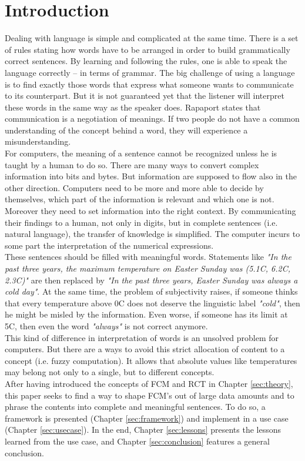 \documentclass[conference]{IEEEtran}
\begin{document}
\section{Introduction}
Dealing with language is simple and complicated at the same time. There is a set of rules stating how words have to be arranged in order to build grammatically correct sentences. By learning and following the rules, one is able to speak the language correctly -- in terms of grammar. The big challenge of using a language is to find exactly those words that express what someone wants to communicate to its counterpart. But it is not guaranteed yet that the listener will interpret these words in the same way as the speaker does. Rapaport \cite{Rapaport2003} states that communication is a negotiation of meanings. If two people do not have a common understanding of the concept behind a word, they will experience a misunderstanding.\\
For computers, the meaning of a sentence cannot be recognized unless he is taught by a human to do so. There are many ways to convert complex information into bits and bytes. But information are supposed to flow also in the other direction. Computers need to be more and more able to decide by themselves, which part of the information is relevant and which one is not. Moreover they need to set information into the right context. By communicating their findings to a human, not only in digits, but in complete sentences (i.e. natural language), the transfer of knowledge is simplified. The computer incurs to some part the interpretation of the numerical expressions.\\
These sentences should be filled with meaningful words. Statements like \emph{"In the past three years, the maximum temperature on Easter Sunday was (5.1\degree C, 6.2\degree C, 2.3\degree C)"} are then replaced by \emph{"In the past three years, Easter Sunday was always a cold day"}. At the same time, the problem of subjectivity raises, if someone thinks that every temperature above 0\degree C does not deserve the linguistic label \emph{"cold"}, then he might be misled by the information. Even worse, if someone has its limit at 5\degree C, then even the word \emph{"always"} is not correct anymore.\\
This kind of difference in interpretation of words is an unsolved problem for computers. But there are a ways to avoid this strict allocation of content to a concept (i.e. fuzzy computation). It allows that absolute values like temperatures may belong not only to a single, but to different concepts.\\
After having introduced the concepts of FCM and RCT in Chapter \ref{sec:theory}, this paper seeks to find a way to shape FCM's out of large data amounts and to phrase the contents into complete and meaningful sentences. To do so, a framework is presented (Chapter \ref{sec:framework}) and implement in a use case (Chapter \ref{sec:usecase}). In the end, Chapter \ref{sec:lessons} presents the lessons learned from the use case, and Chapter \ref{sec:conclusion} features a general conclusion.\\
\end{document}
